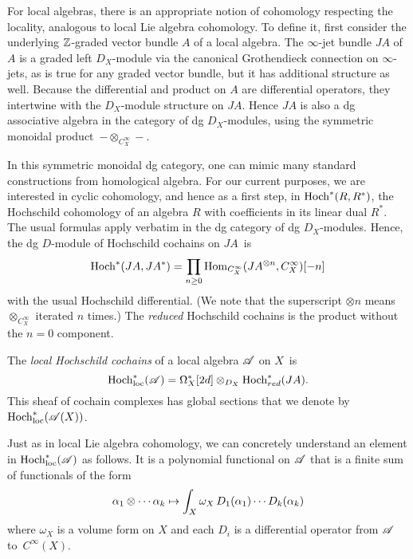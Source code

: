 For local algebras, there is an appropriate notion of cohomology respecting the locality, 
analogous to local Lie algebra cohomology. 
To define it, first consider the underlying $\mathbb Z$-graded vector bundle $A$ of a local algebra. 
The $\infty$-jet bundle $JA$ of $A$ is a graded left $D_X$-module via the canonical Grothendieck connection on $\infty$-jets,
as is true for any graded vector bundle,
but it has additional structure as well.
Because the differential and product on $A$ are differential operators, 
they intertwine with the $D_X$-module structure on $JA$.
Hence $JA$ is also a dg associative algebra in the category of dg $D_X$-modules,
using the symmetric monoidal product~$- \otimes_{C^\infty_X} -$. 


In this symmetric monoidal dg category, 
one can mimic many standard constructions from homological algebra.
For our current purposes, we are interested in cyclic cohomology,
and hence as a first step, in $\Hoch^*(R,R^*)$, the Hochschild cohomology of an algebra $R$ with coefficients in its linear dual $R^*$.
The usual formulas apply verbatim in the dg category of dg $D_X$-modules.
Hence, the dg $D$-module of Hochschild cochains on $JA$~is 
\[
\Hoch^* (JA, JA^*) = \prod_{n \geq 0} {\rm Hom}_{C^\infty_X} (JA^{\tensor n}, C^\infty_X)[-n]
\]
with the usual Hochschild differential.
(We note that the superscript $\otimes n$ means $\otimes_{C^\infty_X}$ iterated $n$ times.)
The {\em reduced} Hochschild cochains is the product without the $n=0$ component. 

\def\Hoch{{\rm Hoch}}
\def\Hochloc{{\rm Hoch}_{\rm loc}}
\def\Cyc{{\rm Cyc}}
\def\Cycloc{{\rm Cyc}_{\rm loc}}


\begin{dfn}\label{dfn: hochloc}
The {\em local Hochschild cochains} of a local algebra $\mathscr A$ on $X$~is 
\[
\Hochloc^*(\sA) = \Omega^*_X[2d] \tensor_{D_X} \Hoch^*_{red} (JA) .
\] 
This sheaf of cochain complexes has global sections that we denote by~$\Hochloc^*(\sA(X))$.
\end{dfn}

Just as in local Lie algebra cohomology, we can concretely understand an element in $\Hochloc^*(\sA)$ as follows.
It is a polynomial functional  on $\mathscr A$ that is a finite sum of functionals of the form
\[
\alpha_1 \otimes \cdots \alpha_k \mapsto \int_X \omega_X \, D_1(\alpha_1) \cdots D_k(\alpha_k)
\]
where $\omega_X$ is a volume form on $X$ and each $D_i$ is a differential operator from $\mathscr A$ to~$C^\infty(X)$. 

